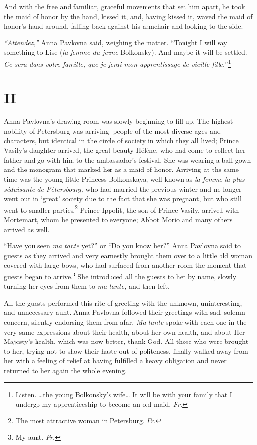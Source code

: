 And with the free and familiar, graceful movements that set him apart,
he took the maid of honor by the hand, kissed it, and, having kissed
it, waved the maid of honor's hand around, falling back against his
armchair and looking to the side.

\textit{``Attendez,''} Anna Pavlovna said, weighing the
matter. ``Tonight I will say something to Lise (\textit{la femme du
  jeune} Bolkonsky). And maybe it will be settled. \textit{Ce sera
  dans votre famille, que je ferai mon apprentissage de vieille
  fille.}''\footnote{Listen. \ldots{}the young Bolkonsky's
  wife\ldots{} It will be with your family that I undergo my
  apprenticeship to become an old maid. \textit{Fr.}}

\section*{II} %

Anna Pavlovna's drawing room was slowly beginning to fill up. The
highest nobility of Petersburg was arriving, people of the most
diverse ages and characters, but identical in the circle of society in
which they all lived; Prince Vasily's daughter arrived, the great
beauty H\'el\`ene, who had come to collect her father and go with him
to the ambassador's festival. She was wearing a ball gown and the
monogram that marked her as a maid of honor. Arriving at the same time
was the young little Princess Bolkonskaya, well-known as \textit{la
  femme la plus s\'eduisante de P\'etersbourg,} who had married the
previous winter and no longer went out in `great' society due to the
fact that she was pregnant, but who still went to smaller
parties.\footnote{The most attractive woman in
  Petersburg. \textit{Fr.}} Prince Ippolit, the son of Prince Vasily,
arrived with Mortemart, whom he presented to everyone; Abbot Morio and
many others arrived as well.

``Have you seen \textit{ma tante} yet?'' or ``Do you know her?'' Anna
Pavlovna said to guests as they arrived and very earnestly brought
them over to a little old woman covered with large bows, who had
surfaced from another room the moment that guests began to
arrive.\footnote{My aunt. \textit{Fr.}} She introduced all the guests
to her by name, slowly turning her eyes from them to \textit{ma
  tante,} and then left. %

All the guests performed this rite of greeting with the unknown,
uninteresting, and unnecessary aunt. Anna Pavlovna followed their
greetings with sad, solemn concern, silently endorsing them from
afar. \textit{Ma tante} spoke with each one in the very same
expressions about their health, about her own health, and about Her
Majesty's health, which was now better, thank God. All those who were
brought to her, trying not to show their haste out of politeness,
finally walked away from her with a feeling of relief at having
fulfilled a heavy obligation and never returned to her again the whole
evening.

